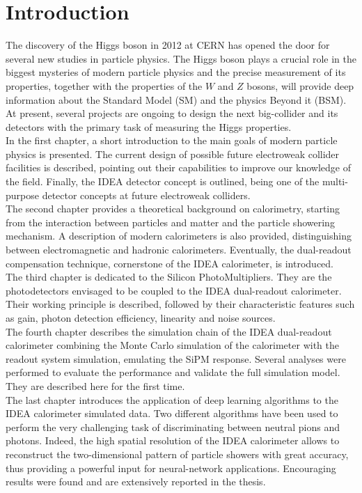 \chapter{Introduction}
The discovery of the Higgs boson in 2012 at CERN has opened the door for several new studies in particle physics.
The Higgs boson plays a crucial role in the biggest mysteries of modern particle physics and the precise measurement of its properties, together with the properties of the $W$ and $Z$ bosons, will provide deep information about the Standard Model (SM) and the physics Beyond it (BSM). At present, several projects are ongoing to design the next big-collider and its detectors with the primary task of measuring the Higgs properties.\\

In the first chapter, a short introduction to the main goals of modern particle physics is presented. The current design of possible future electroweak collider facilities is described, pointing out their capabilities to improve our knowledge of the field.
Finally, the IDEA detector concept is outlined, being one of the multi-purpose detector concepts at future electroweak colliders.\\

The second chapter provides a theoretical background on calorimetry, starting from the interaction between particles and matter and the particle showering mechanism. A description of modern calorimeters is also provided, distinguishing between electromagnetic and hadronic calorimeters. Eventually, the dual-readout compensation technique, cornerstone of the IDEA calorimeter, is introduced.\\

The third chapter is dedicated to the Silicon PhotoMultipliers. They are the photodetectors envisaged to be coupled to the IDEA dual-readout calorimeter. Their working principle is described, followed by their characteristic features such as gain, photon detection efficiency, linearity and noise sources.\\

The fourth chapter describes the simulation chain of the IDEA dual-readout calorimeter combining the Monte Carlo simulation of the calorimeter with the readout system simulation, emulating the SiPM response. Several analyses were performed to evaluate the performance and validate the full simulation model. They are described here for the first time.\\

The last chapter introduces the application of deep learning algorithms to the IDEA calorimeter simulated data. Two different algorithms have been used to perform the very challenging task of discriminating between neutral pions and photons. Indeed, the high spatial resolution of the IDEA calorimeter allows to reconstruct the two-dimensional pattern of particle showers with great accuracy, thus providing a powerful input for neural-network applications. Encouraging results were found and are extensively reported in the thesis.\\